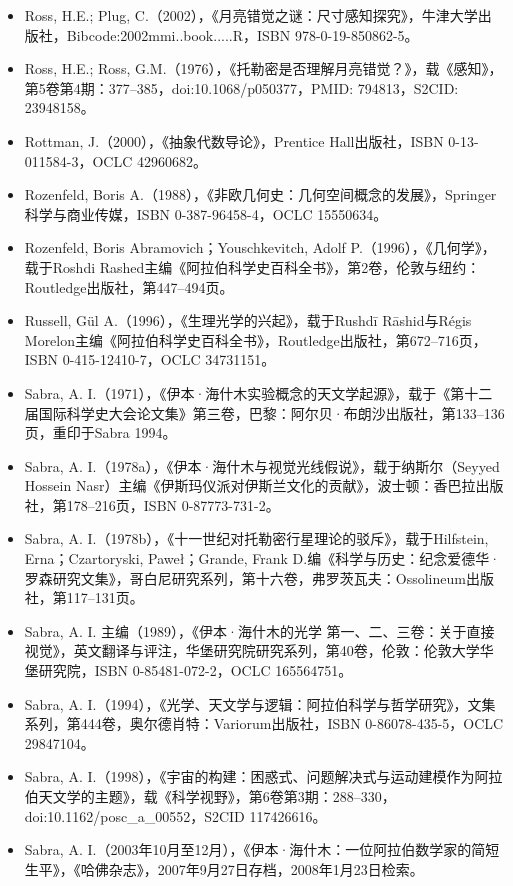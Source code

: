 \begin{itemize}
\item Ross, H.E.; Plug, C.（2002），《月亮错觉之谜：尺寸感知探究》，牛津大学出版社，Bibcode:2002mmi..book.....R，ISBN 978-0-19-850862-5。
\item Ross, H.E.; Ross, G.M.（1976），《托勒密是否理解月亮错觉？》，载《感知》，第5卷第4期：377–385，doi:10.1068/p050377，PMID: 794813，S2CID: 23948158。
\item Rottman, J.（2000），《抽象代数导论》，Prentice Hall出版社，ISBN 0-13-011584-3，OCLC 42960682。
\item Rozenfeld, Boris A.（1988），《非欧几何史：几何空间概念的发展》，Springer科学与商业传媒，ISBN 0-387-96458-4，OCLC 15550634。
\item Rozenfeld, Boris Abramovich；Youschkevitch, Adolf P.（1996），《几何学》，载于Roshdi Rashed主编《阿拉伯科学史百科全书》，第2卷，伦敦与纽约：Routledge出版社，第447–494页。
\item Russell, Gül A.（1996），《生理光学的兴起》，载于Rushdī Rāshid与Régis Morelon主编《阿拉伯科学史百科全书》，Routledge出版社，第672–716页，ISBN 0-415-12410-7，OCLC 34731151。
\item Sabra, A. I.（1971），《伊本·海什木实验概念的天文学起源》，载于《第十二届国际科学史大会论文集》第三卷，巴黎：阿尔贝·布朗沙出版社，第133–136页，重印于Sabra 1994。
\item Sabra, A. I.（1978a），《伊本·海什木与视觉光线假说》，载于纳斯尔（Seyyed Hossein Nasr）主编《伊斯玛仪派对伊斯兰文化的贡献》，波士顿：香巴拉出版社，第178–216页，ISBN 0-87773-731-2。
\item Sabra, A. I.（1978b），《十一世纪对托勒密行星理论的驳斥》，载于Hilfstein, Erna；Czartoryski, Paweł；Grande, Frank D.编《科学与历史：纪念爱德华·罗森研究文集》，哥白尼研究系列，第十六卷，弗罗茨瓦夫：Ossolineum出版社，第117–131页。
\item Sabra, A. I. 主编（1989），《伊本·海什木的光学 第一、二、三卷：关于直接视觉》，英文翻译与评注，华堡研究院研究系列，第40卷，伦敦：伦敦大学华堡研究院，ISBN 0-85481-072-2，OCLC 165564751。
\item Sabra, A. I.（1994），《光学、天文学与逻辑：阿拉伯科学与哲学研究》，文集系列，第444卷，奥尔德肖特：Variorum出版社，ISBN 0-86078-435-5，OCLC 29847104。
\item Sabra, A. I.（1998），《宇宙的构建：困惑式、问题解决式与运动建模作为阿拉伯天文学的主题》，载《科学视野》，第6卷第3期：288–330，doi:10.1162/posc\_a\_00552，S2CID 117426616。
\item Sabra, A. I.（2003年10月至12月），《伊本·海什木：一位阿拉伯数学家的简短生平》，《哈佛杂志》，2007年9月27日存档，2008年1月23日检索。

\end{itemize}
